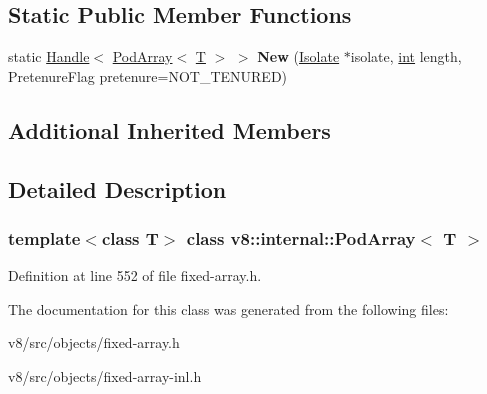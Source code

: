 \subsection*{Static Public Member Functions}
\begin{DoxyCompactItemize}
\item 
\mbox{\label{classv8_1_1internal_1_1PodArray_ac61a63d238c23628273ec6a7129d9094}} 
static \mbox{\hyperlink{classv8_1_1internal_1_1Handle}{Handle}}$<$ \mbox{\hyperlink{classv8_1_1internal_1_1PodArray}{Pod\+Array}}$<$ \mbox{\hyperlink{classv8_1_1internal_1_1torque_1_1T}{T}} $>$ $>$ {\bfseries New} (\mbox{\hyperlink{classv8_1_1internal_1_1Isolate}{Isolate}} $\ast$isolate, \mbox{\hyperlink{classint}{int}} length, Pretenure\+Flag pretenure=N\+O\+T\+\_\+\+T\+E\+N\+U\+R\+ED)
\end{DoxyCompactItemize}
\subsection*{Additional Inherited Members}


\subsection{Detailed Description}
\subsubsection*{template$<$class T$>$\newline
class v8\+::internal\+::\+Pod\+Array$<$ T $>$}



Definition at line 552 of file fixed-\/array.\+h.



The documentation for this class was generated from the following files\+:\begin{DoxyCompactItemize}
\item 
v8/src/objects/fixed-\/array.\+h\item 
v8/src/objects/fixed-\/array-\/inl.\+h\end{DoxyCompactItemize}
